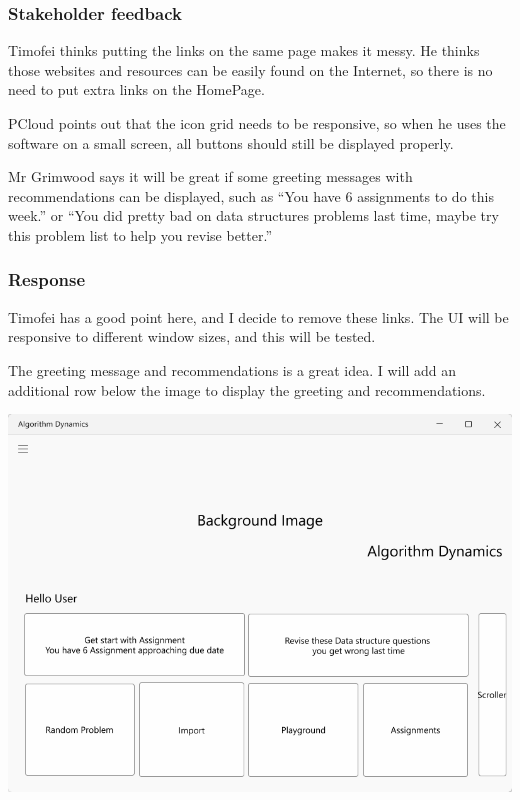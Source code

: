 \documentclass[a4paper]{report}
\begin{document}
\subsubsection{Stakeholder feedback}
\label{subsubsec:homepage stakeholder feedback}

Timofei thinks putting the links on the same page makes it messy. He thinks those websites and resources can be easily found on the Internet, so there is no need to put extra links on the HomePage.

PCloud points out that the icon grid needs to be responsive, so when he uses the software on a small screen, all buttons should still be displayed properly.

Mr Grimwood says it will be great if some greeting messages with recommendations can be displayed, such as ``You have 6 assignments to do this week.'' or ``You did pretty bad on data structures problems last time, maybe try this problem list to help you revise better.''

\subsubsection{Response}

Timofei has a good point here, and I decide to remove these links. The UI will be responsive to different window sizes, and this will be tested.

The greeting message and recommendations is a great idea. I will add an additional row below the image to display the greeting and recommendations.

\includegraphics[width=\textwidth, height=\textheight, keepaspectratio]{HomePage-Updated-design}
\end{document}
